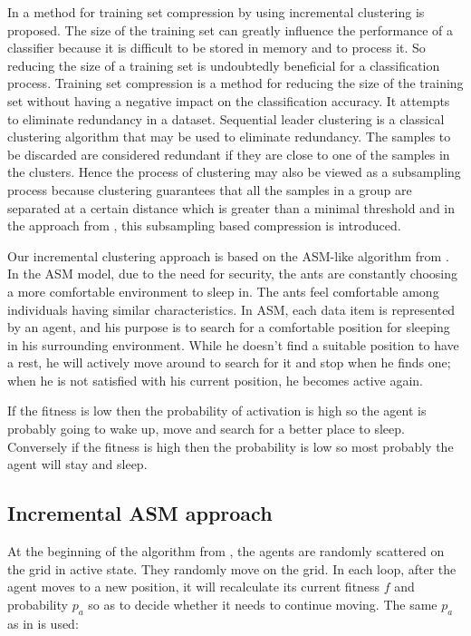 In \cite{Li11Training} a method for training set compression by using incremental clustering is proposed. 
The size of the training set can greatly influence the performance of a classifier because it is difficult to be stored in memory and to process it. So reducing the size of a training set is undoubtedly beneficial for a classification process. 
Training set compression is a method for reducing the size of the training set without having a negative impact on the classification accuracy. It attempts to eliminate redundancy in a dataset. Sequential leader clustering \cite{Hartigan75Clustering} is a classical clustering algorithm that may be used to eliminate redundancy. The samples to be discarded are considered redundant if they are close to one of the samples in the clusters. Hence the process of clustering may also be viewed as a subsampling process because clustering guarantees that all the samples in a group are separated at a certain  distance which is greater than a minimal threshold and in the approach from \cite{Li11Training}, this subsampling based compression is introduced.

Our incremental clustering approach is based on the ASM-like algorithm from \cite{Chen04AnAdaptive}. In the ASM model, due to the need for security, the ants are constantly choosing a more comfortable environment to sleep in. The ants feel comfortable among individuals having similar characteristics. In ASM, each data item is represented by an agent, and his purpose is to search for a comfortable position for sleeping in his surrounding environment. While he doesn't find a suitable position to have a rest, he will actively move around to search for it and stop when he finds one; when he is not satisfied with his current position, he becomes active again. 

If the fitness is low then the probability of activation is high so the agent is probably going to wake up, move and search for a better place to sleep. Conversely if the fitness is high then the probability is low so most probably the agent will stay and sleep.

\subsection{Incremental ASM approach}

At the beginning of the algorithm from \cite{Chen04AnAdaptive}, the agents are randomly scattered on the grid in active state. They randomly move on the grid.
In each loop, after the agent moves to a new position, it will recalculate its current fitness $f$ and probability $p_a$ so as to decide whether it needs to continue moving. The same $p_a$ as in \cite{Chen04AnAdaptive} is used:

